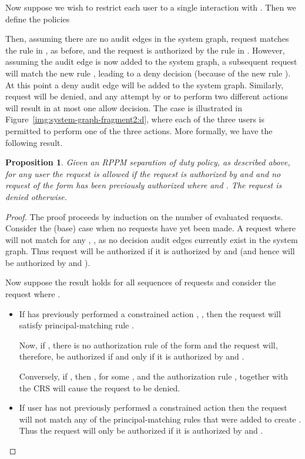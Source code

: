 \documentclass{article}
\newtheorem{proposition}{Proposition}
\begin{document}
Now suppose we wish to restrict each user to a single interaction with .
Then we define the policies

Then, assuming there are no audit edges in the system graph, request  matches the rule in , as before, and the request is authorized by the rule in .
However, assuming the audit edge  is now added to the system graph, a subsequent request  will match the new rule , leading to a deny decision (because of the new rule ).
At this point a deny audit edge will be added to the system graph.
Similarly, request  will be denied, and any attempt by  or  to perform two different actions will result in at most one allow decision.
The case  is illustrated in Figure~\ref{img:system-graph-fragment2:d}, where each of the three users is permitted to perform one of the three actions.
More formally, we have the following result.

\begin{proposition}\label{prop:separation-of-duty}
    Given an RPPM separation of duty policy, as described above, for any user  the request  is allowed if the request is authorized by  and  and no request of the form  has been previously authorized where  and . The request is denied otherwise.
\end{proposition}

\begin{proof}
    The proof proceeds by induction on the number of evaluated requests.
    Consider the (base) case when no requests have yet been made.
    A request  where  will not match  for any , , as no decision audit edges currently exist in the system graph.
    Thus request  will be authorized if it is authorized by  and  (and hence will be authorized by  and ).

    Now suppose the result holds for all sequences of  requests and consider the request  where .
    \begin{itemize}
        \item If  has previously performed a constrained action , , then the request will satisfy principal-matching rule .
	
	      Now, if , there is no authorization rule of the form  and the request will, therefore, be authorized if and only if it is authorized by  and .
	
	      Conversely, if , then , for some , and the authorization rule , together with the  CRS will cause the request to be denied.
        \item If user  has not previously performed a constrained action then the request will not match any of the principal-matching rules that were added to create .
	      Thus the request will only be authorized if it is authorized by  and .
    \end{itemize}
\end{proof}
\end{document}
